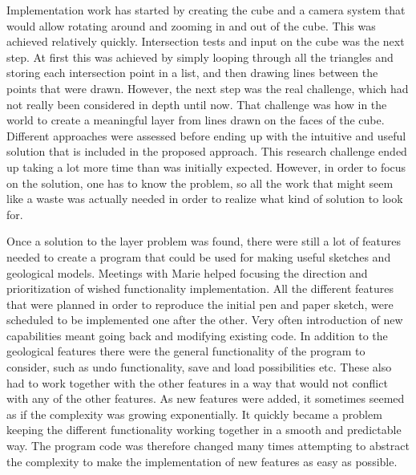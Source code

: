 \documentclass[a4paper,12pt]{report}
\begin{document}
Implementation work has started by creating the cube and a camera system that would allow rotating around and zooming in and out of the cube. This was achieved relatively quickly. Intersection tests and input on the cube was the next step. At first this was achieved by simply looping through all the triangles and storing each intersection point in a list, and then drawing lines between the points that were drawn. However, the next step was the real challenge, which had not really been considered in depth until now. That challenge was how in the world to create a meaningful layer from lines drawn on the faces of the cube. Different approaches were assessed before ending up with the intuitive and useful solution that is included in the proposed approach. This research challenge ended up taking a lot more time than was initially expected. However, in order to focus on the solution, one has to know the problem, so all the work that might seem like a waste was actually needed in order to realize what kind of 
solution to look for.

Once a solution to the layer problem was found, there were still a lot of features needed to create a program that could be used for making useful sketches and geological models. Meetings with Marie helped focusing the direction and prioritization of wished functionality implementation. All the different features that were planned in order to reproduce the initial pen and paper sketch, were scheduled to be implemented one after the other. Very often introduction of new capabilities meant going back and modifying existing code. In addition to the geological features there were the general functionality of the program to consider, such as undo functionality, save and load possibilities etc. These also had to work together with the other features in a way that would not conflict with any of the other features. As new features were added, it sometimes seemed as if the complexity was growing exponentially. It quickly became a problem keeping the different functionality working together in a smooth and predictable 
way. The program code was therefore changed many times attempting to abstract the complexity to make the implementation of new features as easy as possible.
\end{document}
